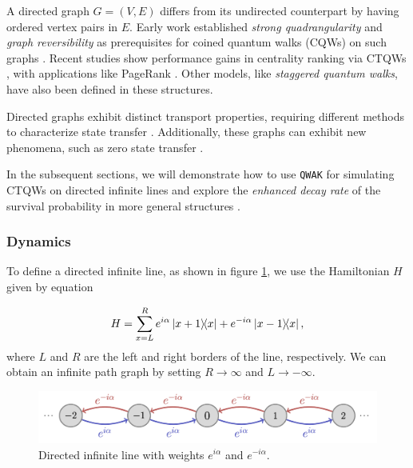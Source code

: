 \documentclass[main.tex]{subfiles}
\begin{document}
A directed graph $G=(V,E)$ differs from its undirected counterpart by having
ordered vertex pairs in $E$. Early work established \textit{strong
quadrangularity} and \textit{graph reversibility} as prerequisites for coined
quantum walks (CQWs) on such graphs
\cite{severiniUnderlying03,severiniDigraph03,montanaroQuantum05}. Recent
studies show performance gains in centrality ranking via CTQWs
\cite{Caruso2016}, with applications like PageRank \cite{Wang2020}. Other
models, like \textit{staggered quantum walks}, have also been defined
\cite{chagas20} in these structures.

Directed graphs exhibit distinct transport properties, requiring different
methods to characterize state transfer \cite{godsilPerfect2020}. Additionally,
these graphs can exhibit new phenomena, such as zero state transfer \cite{Sett2019}.

In the subsequent sections, we will demonstrate how to use \texttt{QWAK} for
simulating CTQWs on directed infinite lines and explore the \textit{enhanced
decay rate} of the survival probability \cite{abalEffects06} in more general
structures \cite{Chaves2023}.

\subsubsection{Dynamics}

To define a directed infinite line, as shown in figure \ref{fig:oriented_line},
we use the Hamiltonian $H$ given by equation 

\begin{equation}\label{hamiltonian}
    H = \sum_{x = L}^{R}e^{i\alpha}\ketbra{x+1}{x}+e^{-i\alpha}\ketbra{x-1}{x},
\end{equation}
where $L$ and $R$ are the left and right borders of
the line, respectively. We can obtain an infinite path graph by setting
$R\rightarrow\infty$ and $L\rightarrow -\infty$. 

\begin{figure}[!h]
    \centering
    \includegraphics[width=12cm]{img/QWAK/oriented_infinite_line.png}
    \caption{Directed infinite line with weights $e^{i\alpha}$ and $e^{-i\alpha}$.}
    \label{fig:oriented_line}
\end{figure}
\end{document}
